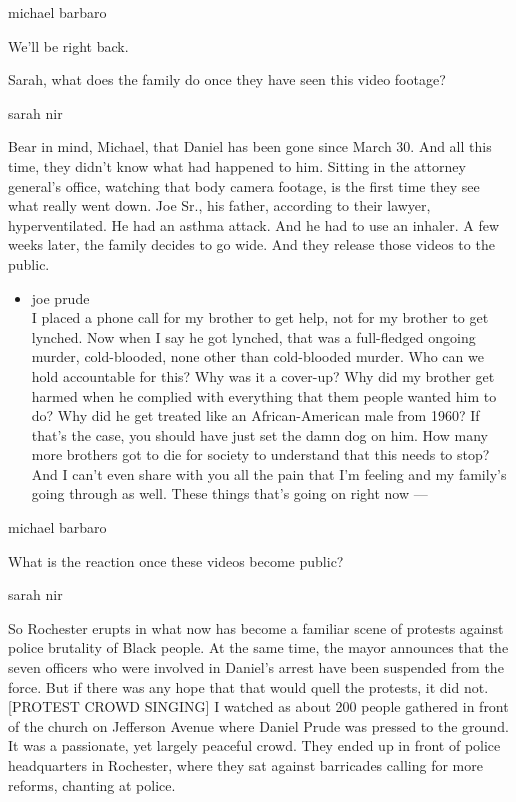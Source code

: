 michael barbaro

We'll be right back.

Sarah, what does the family do once they have seen this video footage?

sarah nir

Bear in mind, Michael, that Daniel has been gone since March 30. And all
this time, they didn't know what had happened to him. Sitting in the
attorney general's office, watching that body camera footage, is the
first time they see what really went down. Joe Sr., his father,
according to their lawyer, hyperventilated. He had an asthma attack. And
he had to use an inhaler. A few weeks later, the family decides to go
wide. And they release those videos to the public.

\begin{itemize}
\tightlist
\item
  joe prude\\
  I placed a phone call for my brother to get help, not for my brother
  to get lynched. Now when I say he got lynched, that was a full-fledged
  ongoing murder, cold-blooded, none other than cold-blooded murder. Who
  can we hold accountable for this? Why was it a cover-up? Why did my
  brother get harmed when he complied with everything that them people
  wanted him to do? Why did he get treated like an African-American male
  from 1960? If that's the case, you should have just set the damn dog
  on him. How many more brothers got to die for society to understand
  that this needs to stop? And I can't even share with you all the pain
  that I'm feeling and my family's going through as well. These things
  that's going on right now ---
\end{itemize}

michael barbaro

What is the reaction once these videos become public?

sarah nir

So Rochester erupts in what now has become a familiar scene of protests
against police brutality of Black people. At the same time, the mayor
announces that the seven officers who were involved in Daniel's arrest
have been suspended from the force. But if there was any hope that that
would quell the protests, it did not. {[}PROTEST CROWD SINGING{]} I
watched as about 200 people gathered in front of the church on Jefferson
Avenue where Daniel Prude was pressed to the ground. It was a
passionate, yet largely peaceful crowd. They ended up in front of police
headquarters in Rochester, where they sat against barricades calling for
more reforms, chanting at police.

